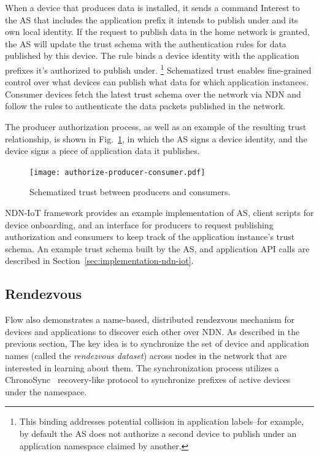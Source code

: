 When a device that produces data is installed, it sends a command Interest to the AS that includes the application prefix it intends to publish under and its own local identity.
If the request to publish data in the home network is granted, the AS will update the trust schema with the authentication rules for data published by this device.
The rule binds a device identity with the application prefixes it's authorized to publish under.
\footnote{This binding addresses potential collision in application labels--for example, by default the AS does not authorize a second device to publish under an application namespace claimed by another.}
Schematized trust enables fine-grained control over what devices can publish what data for which application instances.
Consumer devices fetch the latest trust schema over the network via NDN and follow the rules to authenticate the data packets published in the network.

The producer authorization process, as well as an example of the resulting trust relationship, is shown in Fig.~\ref{fig:flow-app-authorization-trust-relationship}, in which the AS signs a device identity, and the device signs a piece of application data it publishes.

\begin{figure}[!t]
\centering
\texttt{[image: authorize-producer-consumer.pdf]}
\caption{Schematized trust between producers and consumers.}
\label{fig:flow-app-authorization-trust-relationship}
\end{figure}

NDN-IoT framework provides an example implementation of AS, client scripts for device onboarding, and an interface for producers to request publishing authorization and consumers to keep track of the application instance's trust schema.
An example trust schema built by the AS, and application API calls are described in Section~\ref{sec:implementation-ndn-iot}.

\subsection{Rendezvous}
\label{sec:rendezvous}

Flow also demonstrates a name-based, distributed rendezvous mechanism for devices and applications to discover each other over NDN.
As described in the previous section, The key idea is to synchronize the set of device and application names (called the \textit{rendezvous dataset}) across nodes in the network that are interested in learning about them.
The synchronization process utilizes a ChronoSync~\cite{chronosync} recovery-like protocol to synchronize prefixes of active devices under the  namespace.

